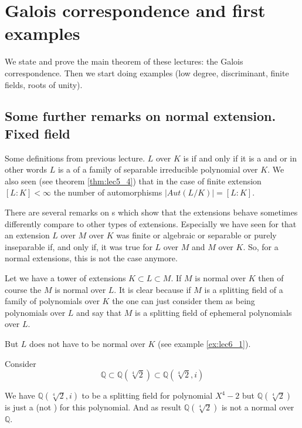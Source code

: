 \chapter{Galois correspondence and first examples}
We state and prove the main theorem of these lectures: the Galois
correspondence. Then we start doing examples (low degree,
discriminant, finite fields, roots of unity).

\section{Some further remarks on normal extension. Fixed field}

Some definitions from previous lecture. $L$ over $K$ is
 if and only if it is a
 and  or
in other words $L$ is a  of a family of
separable irreducible polynomial over $K$. We also seen (see theorem
\ref{thm:lec5_4}) that in the case of finite extension
$\left[L:K\right] < \infty$ the number of automorphisms
$\left|Aut\left(L/K\right)\right| = \left[L:K\right]$.

There are several remarks on s which show
that the extensions behave sometimes differently compare to other
types of extensions. Especially we have seen for that an extension 
$L$ over $M$ over $K$ was finite or algebraic or separable or purely
inseparable if, and only if, it was true for $L$ over $M$ and $M$ over
$K$. So, for a normal extensions, this is not the case anymore.

\begin{remark}
  Let we have a tower of extensions $K \subset L \subset M$. If $M$ is
  normal over $K$ then of course the $M$ is normal over $L$. It is
  clear because if $M$ is a splitting field of a family of polynomials
  over $K$ the one can just consider them as being polynomials over
  $L$ and say that $M$ is a splitting field of ephemeral polynomials
  over $L$.

  But $L$ does not have to be normal over $K$ (see example
  \ref{ex:lec6_1}). 
\end{remark}

\begin{example}
  Consider
  \[
  \mathbb{Q} \subset
  \mathbb{Q}\left(\sqrt[4]{2}\right)
  \subset
  \mathbb{Q}\left(\sqrt[4]{2}, i\right)
  \]

  We have $\mathbb{Q}\left(\sqrt[4]{2}, i\right)$ to be a splitting
  field for polynomial $X^4 -2$ but
  $\mathbb{Q}\left(\sqrt[4]{2}\right)$ is just a
   (not ) for this
  polynomial. And as result $\mathbb{Q}\left(\sqrt[4]{2}\right)$ is
  not a normal over $\mathbb{Q}$.  
  \label{ex:lec6_1}
\end{example}

